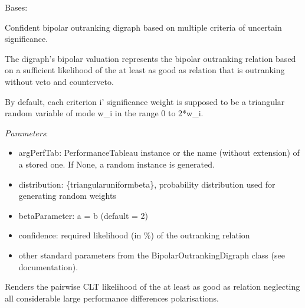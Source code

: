\documentclass[letterpaper,10pt,english]{sphinxmanual}
\begin{document}
\begin{fulllineitems}
\label{techDoc:outrankingDigraphs.ConfidentBipolarOutrankingDigraph}
Bases: {\hyperref[techDoc:outrankingDigraphs.BipolarOutrankingDigraph]{\emph{}}}

Confident bipolar outranking digraph based on multiple criteria of
uncertain significance.

The digraph's bipolar valuation represents the bipolar outranking relation
based on a sufficient likelihood of the at least as good as relation
that is outranking without veto and counterveto.

By default, each criterion i' significance weight is supposed to
be a triangular random variable of mode w\_i in the range 0 to 2*w\_i.

\emph{Parameters}:
\begin{itemize}
\item {} 
argPerfTab: PerformanceTableau instance or the name (without extension) of a stored one. If None, a random instance is generated.

\item {} 
distribution: \{triangular\textbar{}uniform\textbar{}beta\}, probability distribution used for generating random weights

\item {} 
betaParameter: a = b (default = 2)

\item {} 
confidence: required likelihood (in \%) of the outranking relation

\item {} 
other standard parameters from the BipolarOutrankingDigraph class (see documentation).

\end{itemize}

\begin{fulllineitems}
\label{techDoc:outrankingDigraphs.ConfidentBipolarOutrankingDigraph.computeCLTLikelihoods}
Renders the pairwise CLT likelihood of the at least as good as relation
neglecting all considerable large performance differences polarisations.


\end{fulllineitems}
\end{fulllineitems}
\end{document}
